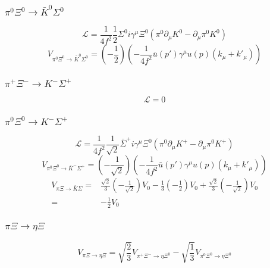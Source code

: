 \subsubsection{$\pi^{0}\Xi^{0}\to \bar{K}^{0}\Sigma^{0}$}
\begin{equation}
	\mathcal{L}=\frac{1}{4f^2}\frac{1}{2}\Sigma^{0}i\gamma^{\mu}\Xi^{0}(\pi^{0}\partial_{\mu}K^{0}-\partial_{\mu}\pi^{0}K^{0})
\end{equation}
\begin{equation}
	V_{\pi^{0}\Xi^{0}\rightarrow \bar{K}^{0}\Sigma^{0}}=\left(-\frac{1}{2}\right)\left(-\frac{1}{4f^2}\bar{u}(p')\gamma^{\mu}u(p)(k_{\mu}+k'_{\mu})\right)
\end{equation}
\subsubsection{$\pi^{+}\Xi^{-}\rightarrow K^{-}\Sigma^{+}$}
\begin{equation}
	\mathcal{L}=0
\end{equation}
\subsubsection{$\pi^{0}\Xi^{0}\rightarrow K^{-}\Sigma^{+}$}
\begin{equation}
	\mathcal{L}=\frac{1}{4f^2}\frac{1}{\sqrt{2}}\bar{\Sigma}^{+}i\gamma^{\mu}\Xi^{0}(\pi^{0}\partial_{\mu}K^{+}-\partial_{\mu}\pi^{0}K^{+})
\end{equation}
\begin{equation}
	V_{\pi^{0}\Xi^{0}\rightarrow \bar{K}^{-}\Sigma^{+}}=\left(-\frac{1}{\sqrt{2}}\right)\left(-\frac{1}{4f^2}\bar{u}(p')\gamma^{\mu}u(p)(k_{\mu}+k'_{\mu})\right)
\end{equation}
\begin{equation}
\begin{split}
	V_{\pi\Xi\rightarrow \bar{K}\Sigma}=&\frac{\sqrt{2}}{3}(-\frac{1}{\sqrt{2}})V_{0}-\frac{1}{3}(-\frac{1}{2})V_{0}+\frac{\sqrt{2}}{3}(-\frac{1}{\sqrt{2}})V_{0}\\
	=&-\frac{1}{2}V_{0}
\end{split}
\end{equation}
\subsubsection{$\pi\Xi\rightarrow\eta\Xi$}
\begin{equation}
	V_{\pi\Xi\rightarrow\eta\Xi}=\sqrt{\frac{2}{3}}V_{\pi^{+}\Xi^{-}\rightarrow\eta\Xi^{0}}-\sqrt{\frac{1}{3}}V_{\pi^{0}\Xi^{0}\rightarrow\eta\Xi^{0}}
\end{equation}
